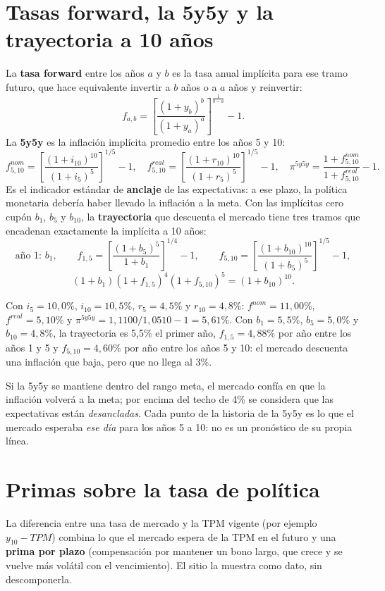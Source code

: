 \section{Tasas forward, la 5y5y y la trayectoria a 10 años}
\label{es:f:forward}
La \textbf{tasa forward} entre los años $a$ y $b$ es la tasa anual implícita para ese tramo futuro, que hace
equivalente invertir a $b$ años o a $a$ años y reinvertir:
\[
f_{a,b}=\left[\frac{(1+y_b)^b}{(1+y_a)^a}\right]^{\frac{1}{b-a}}-1 .
\]
La \textbf{5y5y} es la inflación implícita promedio entre los años 5 y 10:
\[
f^{nom}_{5,10}=\left[\frac{(1+i_{10})^{10}}{(1+i_5)^{5}}\right]^{1/5}\!-1,\quad
f^{real}_{5,10}=\left[\frac{(1+r_{10})^{10}}{(1+r_5)^{5}}\right]^{1/5}\!-1,\quad
\pi^{5y5y}=\frac{1+f^{nom}_{5,10}}{1+f^{real}_{5,10}}-1 .
\]
Es el indicador estándar de \textbf{anclaje} de las expectativas: a ese plazo, la política monetaria debería haber
llevado la inflación a la meta. Con las implícitas cero cupón $b_1$, $b_5$ y $b_{10}$, la \textbf{trayectoria} que
descuenta el mercado tiene tres tramos que encadenan exactamente la implícita a 10 años:
\[
\text{año 1: } b_1,\qquad f_{1,5}=\left[\frac{(1+b_5)^5}{1+b_1}\right]^{1/4}\!-1,\qquad
f_{5,10}=\left[\frac{(1+b_{10})^{10}}{(1+b_5)^5}\right]^{1/5}\!-1,
\]
\[
(1+b_1)(1+f_{1,5})^4(1+f_{5,10})^5=(1+b_{10})^{10}.
\]

\begin{dato}
Con $i_5=10{,}0\%$, $i_{10}=10{,}5\%$, $r_5=4{,}5\%$ y $r_{10}=4{,}8\%$: $f^{nom}=11{,}00\%$, $f^{real}=5{,}10\%$ y
$\pi^{5y5y}=1{,}1100/1{,}0510-1=5{,}61\%$. Con $b_1=5{,}5\%$, $b_5=5{,}0\%$ y $b_{10}=4{,}8\%$, la trayectoria es 5,5\% el
primer año, $f_{1,5}=4{,}88\%$ por año entre los años 1 y 5 y $f_{5,10}=4{,}60\%$ por año entre los años 5 y 10: el
mercado descuenta una inflación que baja, pero que no llega al 3\%.
\end{dato}

\begin{leer}
Si la 5y5y se mantiene dentro del rango meta, el mercado confía en que la inflación volverá a la meta; por encima del
techo de 4\% se considera que las expectativas están \emph{desancladas}. Cada punto de la historia de la 5y5y es lo que
el mercado esperaba \emph{ese día} para los años 5 a 10: no es un pronóstico de su propia línea.
\end{leer}

\section{Primas sobre la tasa de política}
La diferencia entre una tasa de mercado y la TPM vigente (por ejemplo $y_{10}-TPM$) combina lo que el mercado espera de la
TPM en el futuro y una \textbf{prima por plazo} (compensación por mantener un bono largo, que crece y se vuelve más
volátil con el vencimiento). El sitio la muestra como dato, sin descomponerla.

